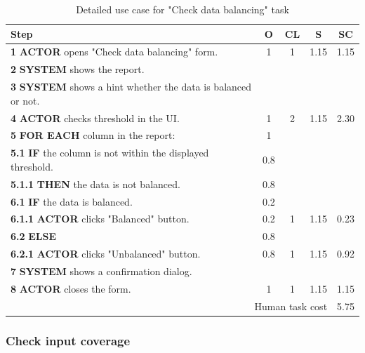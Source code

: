 \begin{table}[H]
\centering
\begin{tabularx}{\textwidth}{|X|c|c|c|c|}
\hline
\textbf{Step} & \textbf{O} & \textbf{CL} & \textbf{S} & \textbf{SC} \\
\hline
\textbf{1} \textbf{ACTOR} opens "Check data balancing" form. & 1 & 1 & 1.15 & 1.15 \\
\hline
\textbf{2} \textbf{SYSTEM} shows the report. & & & & \\
\hline
\textbf{3} \textbf{SYSTEM} shows a hint whether the data is balanced or not. & & & & \\
\hline
\textbf{4} \textbf{ACTOR} checks threshold in the UI. & 1 & 2 & 1.15 & 2.30 \\
\hline
\textbf{5} \textbf{FOR EACH} column in the report: & 1 & & & \\
\hline
\textbf{5.1} \textbf{IF} the column is not within the displayed threshold. & 0.8 & & & \\
\hline
\textbf{5.1.1} \textbf{THEN} the data is not balanced. & 0.8 & & & \\
\hline
\textbf{6.1} \textbf{IF} the data is balanced. & 0.2 & & & \\
\hline
\textbf{6.1.1} \textbf{ACTOR} clicks "Balanced" button. & 0.2 & 1 & 1.15 & 0.23 \\
\hline
\textbf{6.2} \textbf{ELSE} & 0.8 & & & \\
\hline
\textbf{6.2.1} \textbf{ACTOR} clicks "Unbalanced" button. & 0.8 & 1 & 1.15 & 0.92 \\
\hline
\textbf{7} \textbf{SYSTEM} shows a confirmation dialog. & & & & \\
\hline
\textbf{8} \textbf{ACTOR} closes the form. & 1 & 1 & 1.15 & 1.15 \\
\hline
\multicolumn{4}{|r|}{Human task cost} & 5.75 \\
\hline
\end{tabularx}
\caption{Detailed use case for "Check data balancing" task}
\label{table:check_data_balancing}
\end{table}

\subsubsection{Check input coverage}

